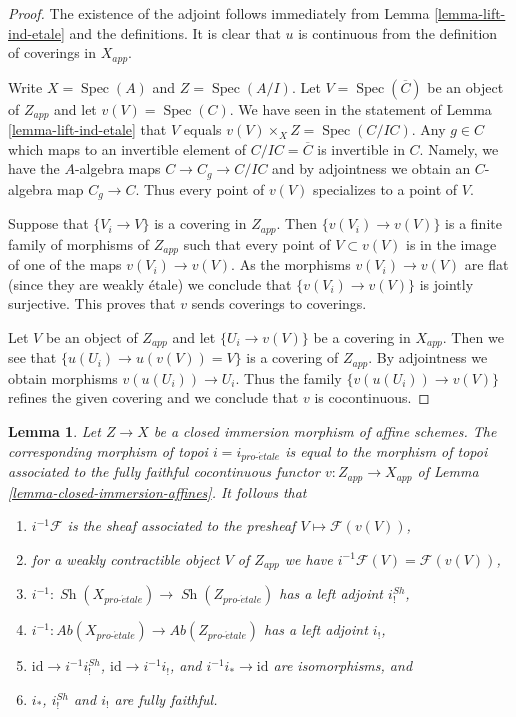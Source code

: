 \documentclass{stacks-project}
\theoremstyle{plain}
\newtheorem{lemma}[subsection]{Lemma}
\theoremstyle{definition}
\theoremstyle{remark}
\numberwithin{equation}{subsection}
\def\Spec{\mathop{\mathrm{Spec}}}
\def\Sh{\mathop{\mathit{Sh}}\nolimits}
\def\proetale{{pro\text{-}\acute{e}tale}}
\begin{document}
\begin{proof}
The existence of the adjoint follows immediately from
Lemma \ref{lemma-lift-ind-etale} and the definitions.
It is clear that $u$ is continuous from the definition of
coverings in $X_{app}$.

\medskip\noindent
Write $X = \Spec(A)$ and $Z = \Spec(A/I)$. Let $V = \Spec(\overline{C})$
be an object of $Z_{app}$ and let $v(V) = \Spec(C)$.
We have seen in the statement of Lemma \ref{lemma-lift-ind-etale}
that $V$ equals $v(V) \times_X Z = \Spec(C/IC)$.
Any $g \in C$ which maps to an invertible element of
$C/IC = \overline{C}$ is invertible in $C$. Namely, we have the
$A$-algebra maps $C \to C_g \to C/IC$ and by adjointness
we obtain an $C$-algebra map $C_g \to C$.
Thus every point of $v(V)$ specializes to a point of $V$.

\medskip\noindent
Suppose that $\{V_i \to V\}$ is a covering in $Z_{app}$.
Then $\{v(V_i) \to v(V)\}$ is a finite family of morphisms of
$Z_{app}$ such that every point of $V \subset v(V)$ is
in the image of one of the maps $v(V_i) \to v(V)$. As the
morphisms $v(V_i) \to v(V)$ are flat (since they are weakly \'etale)
we conclude that $\{v(V_i) \to v(V)\}$ is jointly surjective.
This proves that $v$ sends coverings to coverings.

\medskip\noindent
Let $V$ be an object of $Z_{app}$ and let $\{U_i \to v(V)\}$
be a covering in $X_{app}$. Then we see that
$\{u(U_i) \to u(v(V)) = V\}$ is a covering of $Z_{app}$.
By adjointness we obtain morphisms $v(u(U_i)) \to U_i$.
Thus the family $\{v(u(U_i)) \to v(V)\}$ refines the given
covering and we conclude that $v$ is cocontinuous.
\end{proof}

\begin{lemma}
\label{lemma-closed-immersion-affines-apply}
Let $Z \to X$ be a closed immersion morphism of affine schemes.
The corresponding morphism of topoi $i = i_\proetale$
is equal to the morphism of topoi
associated to the fully faithful cocontinuous functor
$v : Z_{app} \to X_{app}$ of Lemma \ref{lemma-closed-immersion-affines}.
It follows that
\begin{enumerate}
\item $i^{-1}\mathcal{F}$ is the sheaf associated to the presheaf
$V \mapsto \mathcal{F}(v(V))$,
\item for a weakly contractible object $V$ of $Z_{app}$ we have
$i^{-1}\mathcal{F}(V) = \mathcal{F}(v(V))$,
\item $i^{-1} : \Sh(X_\proetale) \to \Sh(Z_\proetale)$
has a left adjoint $i^{Sh}_!$,
\item $i^{-1} : \textit{Ab}(X_\proetale) \to \textit{Ab}(Z_\proetale)$
has a left adjoint $i_!$,
\item $\text{id} \to i^{-1}i^{Sh}_!$, $\text{id} \to i^{-1}i_!$, and
$i^{-1}i_* \to \text{id}$ are isomorphisms, and
\item $i_*$, $i^{Sh}_!$ and $i_!$ are fully faithful.
\end{enumerate}
\end{lemma}
\end{document}
